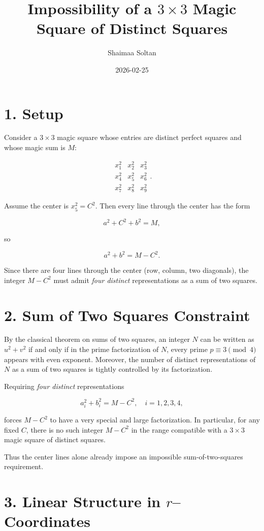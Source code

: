 \documentclass[12pt]{article}
\title{Impossibility of a $3\times 3$ Magic Square of Distinct Squares}
\author{Shaimaa Soltan}
\date{2026-02-25}
\begin{document}
\maketitle

\section*{1. Setup}

Consider a $3\times 3$ magic square whose entries are distinct perfect squares
and whose magic sum is $M$:


\[
\begin{matrix}
x_1^2 & x_2^2 & x_3^2 \\
x_4^2 & x_5^2 & x_6^2 \\
x_7^2 & x_8^2 & x_9^2
\end{matrix}.
\]


Assume the center is $x_5^2 = C^2$.  Then every line through the center has
the form


\[
a^2 + C^2 + b^2 = M,
\]


so


\[
a^2 + b^2 = M - C^2.
\]


Since there are four lines through the center (row, column, two diagonals),
the integer $M - C^2$ must admit \emph{four distinct} representations as a
sum of two squares.

\section*{2. Sum of Two Squares Constraint}

By the classical theorem on sums of two squares, an integer $N$ can be
written as $u^2+v^2$ if and only if in the prime factorization of $N$, every
prime $p \equiv 3 \pmod{4}$ appears with even exponent.  Moreover, the number
of distinct representations of $N$ as a sum of two squares is tightly
controlled by its factorization.

Requiring \emph{four distinct} representations


\[
a_i^2 + b_i^2 = M - C^2,\quad i=1,2,3,4,
\]


forces $M - C^2$ to have a very special and large factorization.  In
particular, for any fixed $C$, there is no such integer $M - C^2$ in the
range compatible with a $3\times 3$ magic square of distinct squares.

Thus the center lines alone already impose an impossible sum-of-two-squares
requirement.

\section*{3. Linear Structure in $r$--Coordinates}
\end{document}
